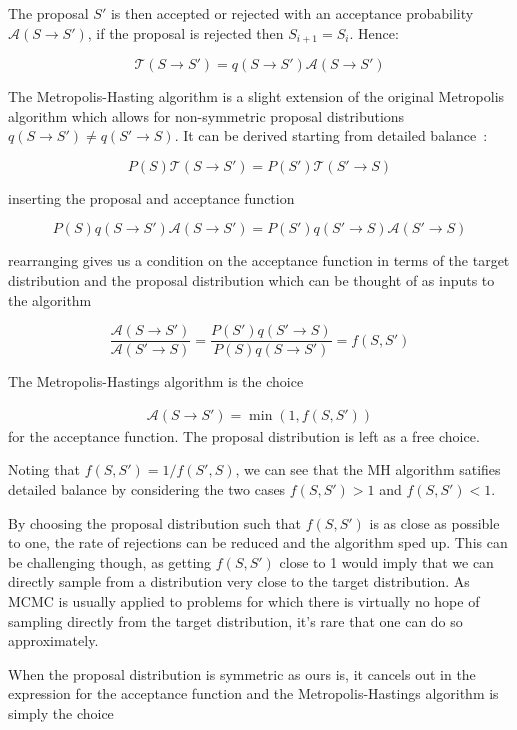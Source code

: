 The proposal \(S'\) is then accepted or rejected with an acceptance probability \(\mathcal{A}(S \to S')\), if the proposal is rejected then \(S_{i+1} = S_{i}\). Hence:

\[\mathcal{T}(S\to S') = q(S\to S')\mathcal{A}(S \to S')\]

The Metropolis-Hasting algorithm is a slight extension of the original Metropolis algorithm which allows for non-symmetric proposal distributions \(q(S\to S') \neq q(S'\to S)\). It can be derived starting from detailed balance~\autocite{krauthIntroductionMonteCarlo1998}:

\[
P(S)\mathcal{T}(S \to S') = P(S')\mathcal{T}(S' \to S)
\]

inserting the proposal and acceptance function

\[
P(S)q(S \to S')\mathcal{A}(S \to S') = P(S')q(S' \to S)\mathcal{A}(S' \to S)
\]

rearranging gives us a condition on the acceptance function in terms of the target distribution and the proposal distribution which can be thought of as inputs to the algorithm

\[
\frac{\mathcal{A}(S \to S')}{\mathcal{A}(S' \to S)} = \frac{P(S')q(S' \to S)}{P(S)q(S \to S')} = f(S, S')
\]

The Metropolis-Hastings algorithm is the choice

\[
\begin{aligned}
\label{eq:mh} 
\mathcal{A}(S \to S') = \min\left(1, f(S,S')\right)
\end{aligned}
\] for the acceptance function. The proposal distribution is left as a free choice.

Noting that \(f(S,S') = 1/f(S',S)\), we can see that the MH algorithm satifies detailed balance by considering the two cases \(f(S,S') > 1\) and \(f(S,S') < 1\).

By choosing the proposal distribution such that \(f(S,S')\) is as close as possible to one, the rate of rejections can be reduced and the algorithm sped up. This can be challenging though, as getting \(f(S,S')\) close to 1 would imply that we can directly sample from a distribution very close to the target distribution. As MCMC is usually applied to problems for which there is virtually no hope of sampling directly from the target distribution, it's rare that one can do so approximately.

When the proposal distribution is symmetric as ours is, it cancels out in the expression for the acceptance function and the Metropolis-Hastings algorithm is simply the choice

